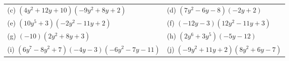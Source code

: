 \begin{enumerate}[noitemsep, label=\textbf{\arabic*}. ]
{\begin{tabular}[t]{|l|l|}
     \tabularnewline\cline{1-1}\cline{2-2}
        (c) $\left(4{y}^{2}+12y+10\right)\left(-9{y}^{2}+8y+2\right)$ &
        (d) $\left(7{y}^{2}-6y-8\right)\left(-2y+2\right)$%
     \tabularnewline\cline{1-1}\cline{2-2}
        (e) $\left(10{y}^{5}+3\right)\left(-2{y}^{2}-11y+2\right)$ &
        (f) $\left(-12y-3\right)\left(12{y}^{2}-11y+3\right)$%
     \tabularnewline\cline{1-1}\cline{2-2}
        (g) $\left(-10\right)\left(2{y}^{2}+8y+3\right)$ &
        (h) $\left(2{y}^{6}+3{y}^{5}\right)\left(-5y-12\right)$%
     \tabularnewline\cline{1-1}\cline{2-2}
        (i) $\left(6{y}^{7}-8{y}^{2}+7\right)\left(-4y-3\right)\left(-6{y}^{2}-7y-11\right)$ &
        (j) $\left(-9{y}^{2}+11y+2\right)\left(8{y}^{2}+6y-7\right)$%

\end{tabular}}
\end{enumerate}
